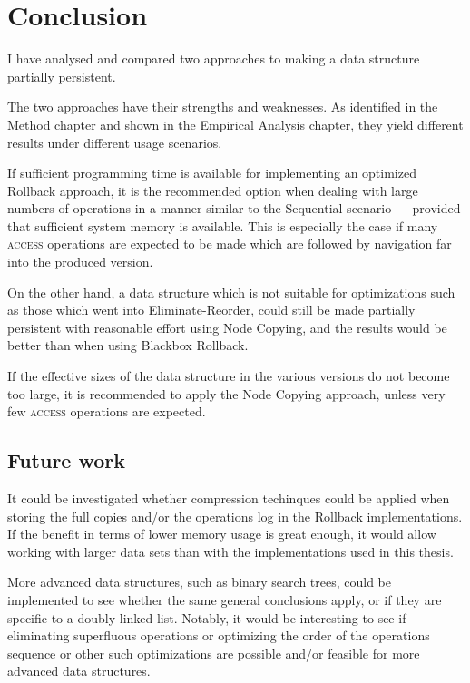 \chapter{Conclusion}
\label{chapter:conclusion}
I have analysed and compared two approaches to making a data structure partially
persistent.

The two approaches have their strengths and weaknesses. As identified in the
Method chapter and shown in the Empirical Analysis chapter, they yield different
results under different usage scenarios.

If sufficient programming time is available for implementing an optimized
Rollback approach, it is the recommended option when dealing with large numbers
of operations in a manner similar to the Sequential scenario --- provided that
sufficient system memory is available. This is especially the case if many
\textsc{access} operations are expected to be made which are followed by
navigation far into the produced version.

On the other hand, a data structure which is not suitable for optimizations such
as those which went into Eliminate-Reorder, could still be made partially
persistent with reasonable effort using Node Copying, and the results would be
better than when using Blackbox Rollback.

If the effective sizes of the data structure in the various versions do not
become too large, it is recommended to apply the Node Copying approach, unless
very few \textsc{access} operations are expected.

\section{Future work}
It could be investigated whether compression techinques could be applied when
storing the full copies and/or the operations log in the Rollback
implementations. If the benefit in terms of lower memory usage is great enough,
it would allow working with larger data sets than with the implementations used
in this thesis.

More advanced data structures, such as binary search trees, could be implemented
to see whether the same general conclusions apply, or if they are specific to a
doubly linked list. Notably, it would be interesting to see if eliminating
superfluous operations or optimizing the order of the operations sequence or
other such optimizations are possible and/or feasible for more advanced data
structures.

